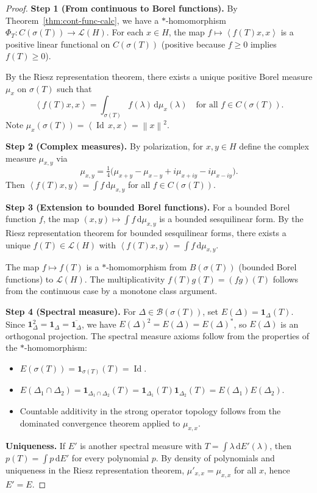 \documentclass[a4paper,12pt]{book}
\DeclareMathOperator{\Id}{Id}
\newcommand{\dd}{\mathrm{d}}
\newcommand{\norm}[1]{\left\| #1 \right\|}
\newcommand{\inner}[2]{\left\langle #1, #2 \right\rangle}
\theoremstyle{definition}
\theoremstyle{plain}
\theoremstyle{remark}
\begin{document}
\begin{proof}
\textbf{Step 1 (From continuous to Borel functions).}
By Theorem~\ref{thm:cont-func-calc}, we have a $*$-homomorphism
$\Phi_T \colon C(\sigma(T)) \to \mathcal{L}(H)$. For each $x \in H$, the map
$f \mapsto \inner{f(T)x}{x}$ is a positive linear functional on $C(\sigma(T))$
(positive because $f \ge 0$ implies $f(T) \ge 0$).

By the Riesz representation theorem,
there exists a unique positive Borel measure $\mu_x$ on $\sigma(T)$ such that
\[
  \inner{f(T)x}{x} = \int_{\sigma(T)} f(\lambda)\, \dd\mu_x(\lambda)
  \quad \text{for all } f \in C(\sigma(T)).
\]
Note $\mu_x(\sigma(T)) = \inner{\Id\, x}{x} = \norm{x}^2$.

\textbf{Step 2 (Complex measures).}
By polarization, for $x, y \in H$ define the complex
measure $\mu_{x,y}$ via
\[
  \mu_{x,y} = \tfrac{1}{4}\bigl(\mu_{x+y} - \mu_{x-y}
  + i\mu_{x+iy} - i\mu_{x-iy}\bigr).
\]
Then $\inner{f(T)x}{y} = \int f\, \dd\mu_{x,y}$ for all $f \in C(\sigma(T))$.

\textbf{Step 3 (Extension to bounded Borel functions).}
For a bounded Borel function $f$, the map $(x, y) \mapsto \int f\, \dd\mu_{x,y}$
is a bounded sesquilinear form. By the Riesz representation theorem for bounded
sesquilinear forms, there exists a unique $f(T) \in \mathcal{L}(H)$ with
$\inner{f(T)x}{y} = \int f\, \dd\mu_{x,y}$.

The map $f \mapsto f(T)$ is a $*$-homomorphism from $B(\sigma(T))$ (bounded Borel
functions) to $\mathcal{L}(H)$. The multiplicativity $f(T)g(T) = (fg)(T)$ follows
from the continuous case by a monotone class argument.

\textbf{Step 4 (Spectral measure).}
For $\Delta \in \mathcal{B}(\sigma(T))$, set $E(\Delta) = \mathbf{1}_\Delta(T)$.
Since $\mathbf{1}_\Delta^2 = \mathbf{1}_\Delta = \overline{\mathbf{1}_\Delta}$,
we have $E(\Delta)^2 = E(\Delta) = E(\Delta)^*$, so $E(\Delta)$ is an orthogonal
projection. The spectral measure axioms follow from the properties of the
$*$-homomorphism:
\begin{itemize}
  \item $E(\sigma(T)) = \mathbf{1}_{\sigma(T)}(T) = \Id$.
  \item $E(\Delta_1 \cap \Delta_2) = \mathbf{1}_{\Delta_1 \cap \Delta_2}(T)
        = \mathbf{1}_{\Delta_1}(T)\mathbf{1}_{\Delta_2}(T) = E(\Delta_1)E(\Delta_2)$.
  \item Countable additivity in the strong operator topology follows from the
        dominated convergence theorem applied to $\mu_{x,x}$.
\end{itemize}

\textbf{Uniqueness.} If $E'$ is another spectral measure with
$T = \int \lambda\, \dd E'(\lambda)$, then $p(T) = \int p\, \dd E'$ for every
polynomial $p$. By density of polynomials and uniqueness in the Riesz representation
theorem, $\mu'_{x,x} = \mu_{x,x}$ for all $x$, hence $E' = E$.
\end{proof}
\end{document}
